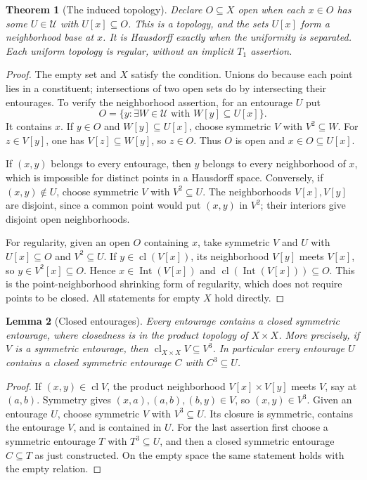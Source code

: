 \documentclass[11pt,oneside,openany]{book}
\newtheorem{theorem}{Theorem}[chapter]
\newtheorem{lemma}[theorem]{Lemma}
\theoremstyle{definition}
\theoremstyle{remark}
\DeclareMathOperator{\cl}{cl}
\DeclareMathOperator{\Int}{Int}
\begin{document}
\begin{theorem}[The induced topology]\label{d10:12:uniform-topology}
Declare $O\subseteq X$ open when each $x\in O$ has some $U\in\mathcal U$ with $U[x]\subseteq O$. This is a topology, and the sets $U[x]$ form a neighborhood base at $x$. It is Hausdorff exactly when the uniformity is separated. Each uniform topology is regular, without an implicit $T_1$ assertion.
\end{theorem}
\begin{proof}
The empty set and $X$ satisfy the condition. Unions do because each point lies in a constituent; intersections of two open sets do by intersecting their entourages. To verify the neighborhood assertion, for an entourage $U$ put
\[
 O=\{y:\exists W\in\mathcal U\text{ with }W[y]\subseteq U[x]\}.
\]
It contains $x$. If $y\in O$ and $W[y]\subseteq U[x]$, choose symmetric $V$ with $V^2\subseteq W$. For $z\in V[y]$, one has $V[z]\subseteq W[y]$, so $z\in O$. Thus $O$ is open and $x\in O\subseteq U[x]$.

If $(x,y)$ belongs to every entourage, then $y$ belongs to every neighborhood of $x$, which is impossible for distinct points in a Hausdorff space. Conversely, if $(x,y)\notin U$, choose symmetric $V$ with $V^2\subseteq U$. The neighborhoods $V[x],V[y]$ are disjoint, since a common point would put $(x,y)$ in $V^2$; their interiors give disjoint open neighborhoods.

For regularity, given an open $O$ containing $x$, take symmetric $V$ and $U$ with $U[x]\subseteq O$ and $V^2\subseteq U$. If $y\in\cl(V[x])$, its neighborhood $V[y]$ meets $V[x]$, so $y\in V^2[x]\subseteq O$. Hence $x\in\Int(V[x])$ and $\cl(\Int(V[x]))\subseteq O$. This is the point-neighborhood shrinking form of regularity, which does not require points to be closed. All statements for empty $X$ hold directly.
\end{proof}

\begin{lemma}[Closed entourages]\label{d10:12:closed-entourages}
Every entourage contains a closed symmetric entourage, where closedness is in the product topology of $X\times X$. More precisely, if $V$ is a symmetric entourage, then $\cl_{X\times X}V\subseteq V^3$. In particular every entourage $U$ contains a closed symmetric entourage $C$ with $C^3\subseteq U$.
\end{lemma}
\begin{proof}
If $(x,y)\in\cl V$, the product neighborhood $V[x]\times V[y]$ meets $V$, say at $(a,b)$. Symmetry gives $(x,a),(a,b),(b,y)\in V$, so $(x,y)\in V^3$. Given an entourage $U$, choose symmetric $V$ with $V^3\subseteq U$. Its closure is symmetric, contains the entourage $V$, and is contained in $U$. For the last assertion first choose a symmetric entourage $T$ with $T^3\subseteq U$, and then a closed symmetric entourage $C\subseteq T$ as just constructed. On the empty space the same statement holds with the empty relation.
\end{proof}
\end{document}
